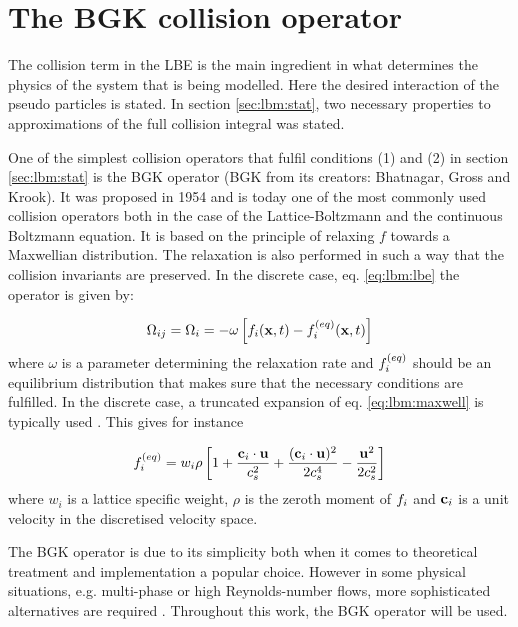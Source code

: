 \section{The BGK collision operator}\label{sec:lbm:col}
The collision term in the LBE is the main ingredient in what
determines the physics of the system that is being modelled. Here the
desired interaction of the pseudo particles is stated. In section
\ref{sec:lbm:stat}, two necessary properties to approximations of the
full collision integral was stated.

One of the simplest collision operators that fulfil conditions (1)
and (2) in section \ref{sec:lbm:stat} is the BGK operator (BGK from
its creators: Bhatnagar, Gross and Krook). It was proposed in 1954 and
is today one of the most commonly used collision operators both in the
case of the Lattice-Boltzmann and the continuous Boltzmann
equation. It is based on the principle of relaxing $f$ towards a
Maxwellian distribution. The relaxation is also performed in such a
way that the collision invariants are preserved.  In the discrete case,
eq. \eqref{eq:lbm:lbe} the operator is given by:

\begin{equation}\label{eq:lbm:bgk}
\Omega_{ij} = \Omega_i = -\omega \left[ f_i(\mathbf{x}, t) - f_i^{(eq)}(\mathbf{x}, t)
  \right]
\end{equation}
where $\omega$ is a parameter determining the relaxation rate and
$f_i^{(eq)}$ should be an equilibrium distribution that makes sure that the
necessary conditions are fulfilled. In the discrete case, a truncated
expansion of eq. \eqref{eq:lbm:maxwell} is typically used
\cite{wolf-gladrow}. This gives for instance


\begin{equation}
f_i^{(eq)} = w_i\rho \left [ 1 + \frac{\mathbf{c}_i \cdot \mathbf{u}}{c_s^2} +
  \frac{(\mathbf{c}_i \cdot \mathbf{u})^2}{2c_s^4} - \frac{\mathbf{u}^2}{2c_s^2} \right]
\end{equation}
where $w_i$ is a lattice specific weight, $\rho$ is the zeroth moment
of $f_i$ and $\mathbf{c}_i$ is a unit velocity in the discretised velocity
space.

The BGK operator is due to its simplicity both when it comes to
theoretical treatment and implementation a popular choice. However in
some physical situations, e.g. multi-phase or high Reynolds-number
flows, more sophisticated alternatives are required
\cite{wolf-gladrow}. Throughout this work, the BGK operator will be
used.
